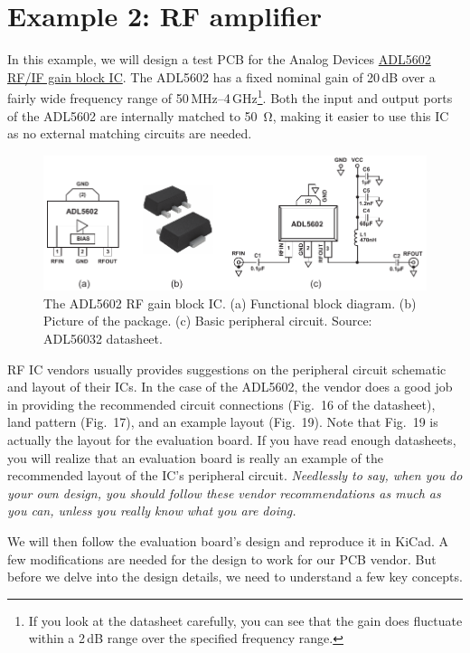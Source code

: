 \documentclass[12pt,letterpaper]{scrartcl}
\begin{document}
\newpage
\section{Example 2: RF amplifier}


In this example, we will design a test PCB for the Analog Devices \href{http://www.analog.com/media/en/technical-documentation/evaluation-documentation/ADL5602.pdf}{ADL5602 RF/IF gain block IC}. The ADL5602 has a fixed nominal gain of 20\,dB over a fairly wide frequency range of 50\,MHz--4\,GHz\footnote{If you look at the datasheet carefully, you can see that the gain does fluctuate within a 2\,dB range over the specified frequency range.}. Both the input and output ports of the ADL5602 are internally matched to \SI{50}{\ohm}, making it easier to use this IC as no external matching circuits are needed. 

	\begin{figure}[h]
		\centering
		\includegraphics[width=6in]{adl5602}
		\caption{The ADL5602 RF gain block IC. (a) Functional block diagram. (b) Picture of the package. (c) Basic peripheral circuit. Source: ADL56032 datasheet.}
		\label{fig:adl5602}
	\end{figure}

RF IC vendors usually provides suggestions on the peripheral circuit schematic and layout of their ICs. In the case of the ADL5602, the vendor does a good job in providing the recommended circuit connections (Fig.~16 of the datasheet), land pattern (Fig.~17), and an example layout (Fig.~19). Note that Fig.~19 is actually the layout for the evaluation board. If you have read enough datasheets, you will realize that an evaluation board is really an example of the recommended layout of the IC's peripheral circuit. \textit{Needlessly to say, when you do your own design, you should follow these vendor recommendations as much as you can, unless you really know what you are doing.} 

We will then follow the evaluation board's design and reproduce it in KiCad. A few modifications are needed for the design to work for our PCB vendor. But before we delve into the design details, we need to understand a few key concepts.
\end{document}
